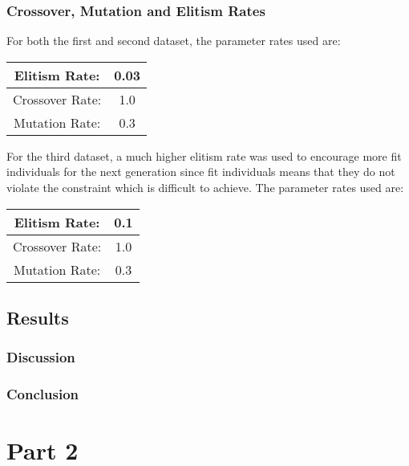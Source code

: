 \documentclass{article}
\begin{document}
\subsubsection*{Crossover, Mutation and Elitism Rates}
For both the first and second dataset, the parameter rates used are: 
\begin{center}
\begin{tabular}{|c|c|}
	\hline
	Elitism Rate: & 0.03 \\
	\hline
	Crossover Rate: & 1.0 \\
	\hline
	Mutation Rate: & 0.3 \\
	\hline
\end{tabular}
\end{center}
For the third dataset, a much higher elitism rate was used to encourage more fit individuals for the next generation since fit individuals means that they do not violate the constraint which is difficult to achieve. The parameter rates used are:
\begin{center}
\begin{tabular}{|c|c|}
	\hline
	Elitism Rate: & 0.1 \\
	\hline
	Crossover Rate: & 1.0 \\
	\hline
	Mutation Rate:	& 0.3 \\
	\hline
\end{tabular}
\end{center}
\subsection*{Results}
\subsubsection*{Discussion}
\subsubsection*{Conclusion}
\section*{Part 2}
\end{document}
